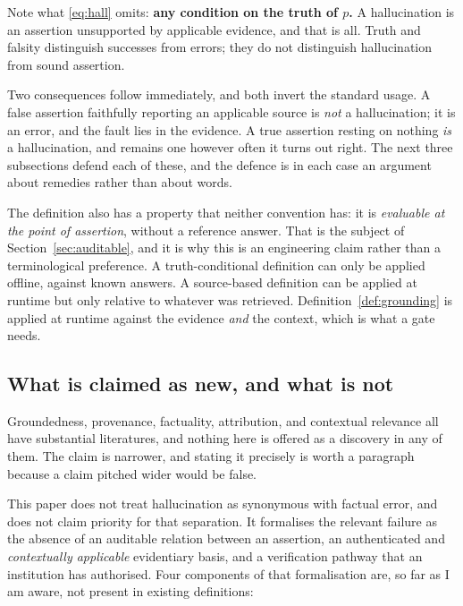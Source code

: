 \documentclass[11pt]{article}
\theoremstyle{plain}
\theoremstyle{definition}
\begin{document}
Note what \eqref{eq:hall} omits: \textbf{any condition on the truth of $p$.} A
hallucination is an assertion unsupported by applicable evidence, and that is all.
Truth and falsity distinguish successes from errors; they do not distinguish
hallucination from sound assertion.

Two consequences follow immediately, and both invert the standard usage. A false
assertion faithfully reporting an applicable source is \emph{not} a hallucination;
it is an error, and the fault lies in the evidence. A true assertion resting on
nothing \emph{is} a hallucination, and remains one however often it turns out
right. The next three subsections defend each of these, and the defence is in each
case an argument about remedies rather than about words.

The definition also has a property that neither convention has: it is
\emph{evaluable at the point of assertion}, without a reference answer. That is the
subject of Section~\ref{sec:auditable}, and it is why this is an engineering claim
rather than a terminological preference. A truth-conditional definition can only be
applied offline, against known answers. A source-based definition can be applied at
runtime but only relative to whatever was retrieved. Definition~\ref{def:grounding}
is applied at runtime against the evidence \emph{and} the context, which is what a
gate needs.

\subsection{What is claimed as new, and what is not}
\label{sec:novelty}

Groundedness, provenance, factuality, attribution, and contextual relevance all have
substantial literatures, and nothing here is offered as a discovery in any of them.
The claim is narrower, and stating it precisely is worth a paragraph because a claim
pitched wider would be false.

This paper does not treat hallucination as synonymous with factual error, and does
not claim priority for that separation. It formalises the relevant failure as the
absence of an auditable relation between an assertion, an authenticated and
\emph{contextually applicable} evidentiary basis, and a verification pathway that an
institution has authorised. Four components of that formalisation are, so far as I am
aware, not present in existing definitions:
\end{document}
